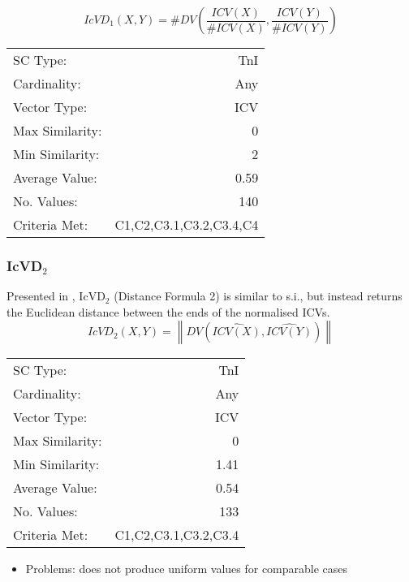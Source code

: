 \documentclass{article}
\begin{document}
$$IcVD_{1}(X,Y)=\#DV\left(\frac{ICV(X)}{\#ICV(X)},\frac{ICV(Y)}{\#ICV(Y)}\right)$$


\begin{center}
\begin{tabular}{lr}
 SC Type:         &                      TnI  \\
 Cardinality:     &                      Any  \\
 Vector Type:     &                      ICV  \\
 Max Similarity:  &                        0  \\
 Min Similarity:  &                        2  \\
 Average Value:   &                     0.59  \\
 No. Values:      &                      140  \\
 Criteria Met:    &  C1,C2,C3.1,C3.2,C3.4,C4  \\
\end{tabular}
\end{center}
\subsubsection{IcVD$_{2}$}
\label{sec-11-4-2}

Presented in \citet{Rogers1992}, IcVD$_{2}$ (Distance Formula 2) is
similar to s.i., but instead returns the Euclidean distance between
the ends of the normalised ICVs.
$$IcVD_{2}(X,Y)=\left\|DV(\hat{ICV(X)},\hat{ICV(Y)})\right\|$$

\begin{center}
\begin{tabular}{lr}
 SC Type:         &                   TnI  \\
 Cardinality:     &                   Any  \\
 Vector Type:     &                   ICV  \\
 Max Similarity:  &                     0  \\
 Min Similarity:  &                  1.41  \\
 Average Value:   &                  0.54  \\
 No. Values:      &                   133  \\
 Criteria Met:    &  C1,C2,C3.1,C3.2,C3.4  \\
\end{tabular}
\end{center}


\begin{itemize}
\item Problems: does not produce uniform values for comparable cases
\end{itemize}
\end{document}

